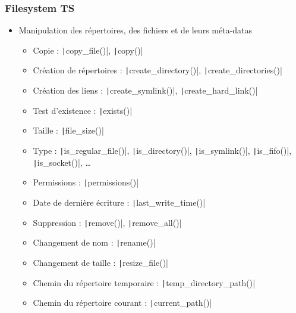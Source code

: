 \documentclass[C++.tex]{subfiles}
\begin{document}
\begin{frame}[fragile]
	\frametitle{Filesystem TS}
	\begin{itemize}
		\item Manipulation des répertoires, des fichiers et de leurs méta-datas
		\begin{itemize}
			\item Copie : \texttt|copy_file()|, \texttt|copy()|
			\item Création de répertoires : \texttt|create_directory()|, \texttt|create_directories()|


			\item Création des liens : \texttt|create_symlink()|, \texttt|create_hard_link()|
			\item Test d'existence : \texttt|exists()|
			\item Taille : \texttt|file_size()|
			\item Type : \texttt|is_regular_file()|, \texttt|is_directory()|, \texttt|is_symlink()|, \texttt|is_fifo()|, \texttt|is_socket()|, \ldots{}
			\item Permissions : \texttt|permissions()|
			\item Date de dernière écriture : \texttt|last_write_time()|
			\item Suppression : \texttt|remove()|, \texttt|remove_all()|


			\item Changement de nom : \texttt|rename()|
			\item Changement de taille : \texttt|resize_file()|
			\item Chemin du répertoire temporaire : \texttt|temp_directory_path()|
			\item Chemin du répertoire courant : \texttt|current_path()|
		\end{itemize}
	\end{itemize}

\end{frame}
\end{document}

